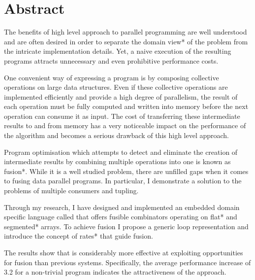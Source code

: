 \documentclass[preamble.tex]{subfiles}
\begin{document}
\clearpage

\chapter*{Abstract}

The benefits of high level approach to parallel programming are well understood and are often desired in order to separate the \*domain view* of the problem from the intricate implementation details. Yet, a naive execution of the resulting programs attracts unnecessary and even prohibitive performance costs.

One convenient way of expressing a program is by composing collective operations on large data structures. Even if these collective operations are implemented efficiently and provide a high degree of parallelism, the result of each operation must be fully computed and written into memory before the next operation can consume it as input. The cost of transferring these intermediate results to and from memory has a very noticeable impact on the performance of the algorithm and becomes a serious drawback of this high level approach.

Program optimisation which attempts to detect and eliminate the creation of intermediate results by combining multiple operations into one is known as \*fusion*. While it is a well studied problem, there are unfilled gaps when it comes to fusing data parallel programs. In particular, I demonstrate a solution to the problems of multiple consumers and tupling.

Through my research, I have designed and implemented an embedded domain specific language called \LiveFusion that offers fusible combinators operating on \*flat* and \*segmented* arrays. To achieve fusion I propose a generic loop representation and introduce the concept of \*rates* that guide fusion.

The results show that \LiveFusion is considerably more effective at exploiting opportunities for fusion than previous systems. Specifically, the average performance increase of 3.2 for a non-trivial program indicates the attractiveness of the approach.


\end{document}

